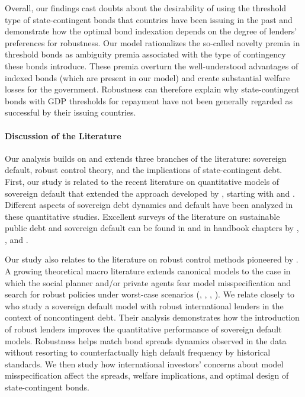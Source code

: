 Overall, our findings cast doubts about the desirability of using the threshold type of state-contingent bonds that countries have been issuing in the past and demonstrate how the optimal bond indexation depends on the degree of lenders' preferences for robustness. Our model rationalizes the so-called novelty premia in threshold bonds as ambiguity premia associated with the type of contingency these bonds introduce. These premia overturn the well-understood advantages of indexed bonds (which are present in our model) and create substantial welfare losses for the government. Robustness can therefore explain why state-contingent bonds with GDP thresholds for repayment have not been generally regarded as successful by their issuing countries.

\paragraph{Discussion of the Literature} Our analysis builds on and extends three branches of the literature: sovereign default, robust control theory, and the implications of state-contingent debt. First, our study is related to the recent literature on quantitative models of sovereign default that extended the approach developed by \cite{Eaton81}, starting with \cite{AG_06} and \cite{Arellano05}. Different aspects of sovereign debt dynamics and default have been analyzed in these quantitative studies. Excellent surveys of the literature on sustainable public debt and sovereign default can be found in \citet*{AguiarAmador2021} and in handbook chapters by \citet{AguiarAmadorHandbook}, \cite*{ACCS}, and \cite*{DerasmoMendozaZhang}.

Our study also relates to the literature on robust control methods pioneered by \cite{HansenSargent2001,HansenSargent2011}. A growing theoretical macro literature extends canonical models to the case in which the social planner and/or private agents fear model misspecification and search for robust policies under worst-case scenarios (\citealp{AdamWoodford2012}, \citealp{Young12}, \citealp{FerriereKarantounias},  \citealp{MontamatRoch}). We relate closely to \cite{PouzoPresno2016} who study a sovereign default model with robust international lenders in the context of noncontingent debt. Their analysis demonstrates how the introduction of robust lenders improves the quantitative performance of sovereign default models. Robustness helps match bond spreads dynamics observed in the data without resorting to counterfactually high default frequency by historical standards. We then study how international investors' concerns about model misspecification affect the spreads, welfare implications, and optimal design of state-contingent bonds. 

